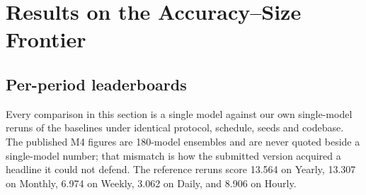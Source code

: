 %
%

\section{Results on the Accuracy--Size Frontier}
\label{sec:results}

\subsection{Per-period leaderboards}
\label{sec:results:m4}

Every comparison in this section is a single model against our own
single-model reruns of the \citet{oreshkin2020nbeats} baselines under
identical protocol, schedule, seeds and codebase. The published M4
figures are 180-model ensembles and are never quoted beside a
single-model number; that mismatch is how the submitted version acquired
a headline it could not defend. The reference reruns score 13.564 on
Yearly, 13.307 on Monthly, 6.974 on Weekly, 3.062 on Daily, and 8.906 on
Hourly.

